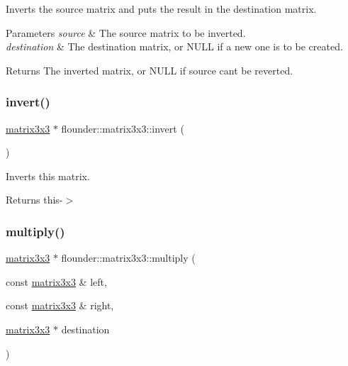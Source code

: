 Inverts the source matrix and puts the result in the destination matrix. 


\begin{DoxyParams}{Parameters}
{\em source} & The source matrix to be inverted. \\
\hline
{\em destination} & The destination matrix, or N\+U\+LL if a new one is to be created. \\
\hline
\end{DoxyParams}
\begin{DoxyReturn}{Returns}
The inverted matrix, or N\+U\+LL if source can\textquotesingle{}t be reverted. 
\end{DoxyReturn}
\mbox{\label{classflounder_1_1matrix3x3_add38efb997787cf7e335ad35f8f34311}} 
\subsubsection{\texorpdfstring{invert()}{invert()}\hspace{0.1cm}{\footnotesize\ttfamily [2/2]}}
{\footnotesize\ttfamily \hyperlink{classflounder_1_1matrix3x3}{matrix3x3} $\ast$ flounder\+::matrix3x3\+::invert (\begin{DoxyParamCaption}{ }\end{DoxyParamCaption})}



Inverts this matrix. 

\begin{DoxyReturn}{Returns}
this-\/$>$ 
\end{DoxyReturn}
\mbox{\label{classflounder_1_1matrix3x3_a7c46f7546804f85fc8d8c55f39c044fd}} 
\subsubsection{\texorpdfstring{multiply()}{multiply()}}
{\footnotesize\ttfamily \hyperlink{classflounder_1_1matrix3x3}{matrix3x3} $\ast$ flounder\+::matrix3x3\+::multiply (\begin{DoxyParamCaption}\item[{const \hyperlink{classflounder_1_1matrix3x3}{matrix3x3} \&}]{left,  }\item[{const \hyperlink{classflounder_1_1matrix3x3}{matrix3x3} \&}]{right,  }\item[{\hyperlink{classflounder_1_1matrix3x3}{matrix3x3} $\ast$}]{destination }\end{DoxyParamCaption})\hspace{0.3cm}{\ttfamily [static]}}



